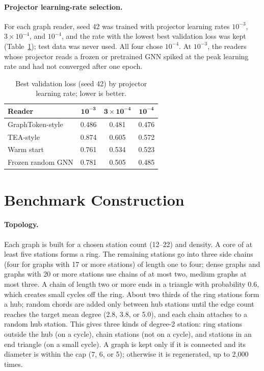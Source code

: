 \documentclass[11pt]{article}
\begin{document}
\paragraph{Projector learning-rate selection.}
For each graph reader, seed 42 was trained with projector learning rates $10^{-3}$, $3{\times}10^{-4}$, and $10^{-4}$, and the rate with the lowest best validation loss was kept (Table~\ref{tab:lr}); test data was never used.
All four chose $10^{-4}$.
At $10^{-3}$, the readers whose projector reads a frozen or pretrained GNN spiked at the peak learning rate and had not converged after one epoch.

\begin{table}[t]
\centering
\small
\begin{tabular}{@{}lccc@{}}
\toprule
\textbf{Reader} & $\mathbf{10^{-3}}$ & $\mathbf{3{\times}10^{-4}}$ & $\mathbf{10^{-4}}$ \\
\midrule
GraphToken-style & 0.486 & 0.481 & 0.476 \\
TEA-style & 0.874 & 0.605 & 0.572 \\
Warm start & 0.761 & 0.534 & 0.523 \\
Frozen random GNN & 0.781 & 0.505 & 0.485 \\
\bottomrule
\end{tabular}
\caption{Best validation loss (seed 42) by projector learning rate; lower is better.}
\label{tab:lr}
\end{table}

\section{Benchmark Construction}
\label{app:benchmark}

\paragraph{Topology.}
Each graph is built for a chosen station count (12--22) and density.
A core of at least five stations forms a ring.
The remaining stations go into three side chains (four for graphs with 17 or more stations) of length one to four; dense graphs and graphs with 20 or more stations use chains of at most two, medium graphs at most three.
A chain of length two or more ends in a triangle with probability 0.6, which creates small cycles off the ring.
About two thirds of the ring stations form a hub; random chords are added only between hub stations until the edge count reaches the target mean degree (2.8, 3.8, or 5.0), and each chain attaches to a random hub station.
This gives three kinds of degree-2 station: ring stations outside the hub (on a cycle), chain stations (not on a cycle), and stations in an end triangle (on a small cycle).
A graph is kept only if it is connected and its diameter is within the cap (7, 6, or 5); otherwise it is regenerated, up to 2{,}000 times.
\end{document}
